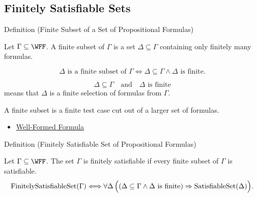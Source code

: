 \subsection*{Finitely Satisfiable Sets}

\begin{definitionbox}{Definition (Finite Subset of a Set of Propositional Formulas)}
\begin{definition}
\label{def:finite-subset-of-set-of-propositional-formulas}
Let \(\Gamma\subseteq\WFF\). A finite subset of \(\Gamma\) is a set
\(\Delta\subseteq\Gamma\) containing only finitely many formulas.
\end{definition}
\end{definitionbox}

\begin{remark*}
\[
\Delta\text{ is a finite subset of }\Gamma
\Longleftrightarrow
\Delta\subseteq\Gamma\land \Delta\text{ is finite}.
\]
\end{remark*}

\begin{remark*}
\[
\Delta\subseteq\Gamma
\quad\text{and}\quad
\Delta\text{ is finite}
\]
means that \(\Delta\) is a finite selection of formulas from \(\Gamma\).
\end{remark*}

\begin{remark*}[Interpretation]
A finite subset is a finite test case cut out of a larger set of formulas.
\end{remark*}

\begin{dependencies}
\begin{itemize}
  \item \hyperref[def:well-formed-formula]{Well-Formed Formula}
\end{itemize}
\end{dependencies}

\begin{definitionbox}{Definition (Finitely Satisfiable Set of Propositional Formulas)}
\begin{definition}
\label{def:finitely-satisfiable-set-of-propositional-formulas}
Let \(\Gamma\subseteq\WFF\). The set \(\Gamma\) is finitely satisfiable if every
finite subset of \(\Gamma\) is satisfiable.
\[
\operatorname{FinitelySatisfiableSet}(\Gamma)
\Longleftrightarrow
\forall\Delta\,\Bigl((\Delta\subseteq\Gamma\land \Delta\text{ is finite})
\Rightarrow \operatorname{SatisfiableSet}(\Delta)\Bigr).
\]
\end{definition}
\end{definitionbox}

